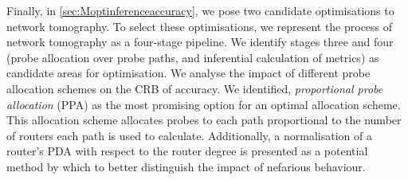 Finally, in \cref{sec:Moptinferenceaccuracy}, we pose two candidate optimisations to network tomography. To select these optimisations, we represent the process of network tomography as a four-stage pipeline. We identify stages three and four (probe allocation over probe paths, and inferential calculation of metrics) as candidate areas for optimisation. We analyse the impact of different probe allocation schemes on the CRB of accuracy. We identified, \textit{proportional probe allocation} (PPA) as the most promising option for an optimal allocation scheme. This allocation scheme allocates probes to each path proportional to the number of routers each path is used to calculate. Additionally, a normalisation of a router's PDA with respect to the router degree is presented as a potential method by which to better distinguish the impact of nefarious behaviour.\par